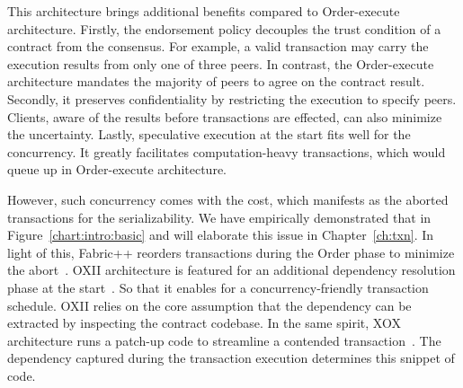 This architecture brings additional benefits compared to Order-execute architecture. 
Firstly, the endorsement policy decouples the trust condition of a contract from the consensus. 
For example, a valid transaction may carry the execution results from only one of three peers. 
In contrast, the Order-execute architecture mandates the majority of peers to agree on the contract result. 
Secondly, it preserves confidentiality by restricting the execution to specify peers.
Clients, aware of the results before transactions are effected, can also minimize the uncertainty. 
Lastly, speculative execution at the start fits well for the concurrency.
It greatly facilitates computation-heavy transactions, which would queue up in Order-execute architecture. 

However, such concurrency comes with the cost, which manifests as the aborted transactions for the serializability. 
We have empirically demonstrated that in Figure~\ref{chart:intro:basic} and will elaborate this issue in Chapter~\ref{ch:txn}. 
In light of this, Fabric++ reorders transactions during the Order phase to minimize the abort~\cite{sharma2019blurring}. 
OXII architecture is featured for an additional dependency resolution phase at the start~\cite{amiri2019parblockchain}.
So that it enables for a concurrency-friendly transaction schedule. 
OXII relies on the core assumption that the dependency can be extracted by inspecting the contract codebase. 
In the same spirit, XOX architecture runs a patch-up code to streamline a contended transaction~\cite{gorenflo2020xox}. 
The dependency captured during the transaction execution determines this snippet of code. 





